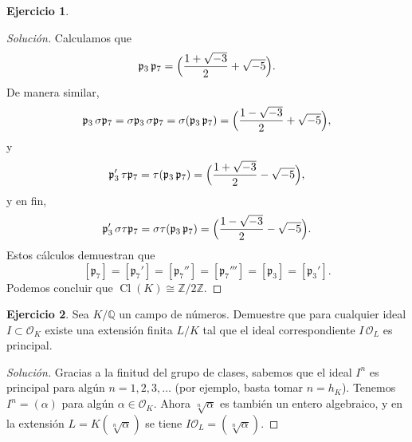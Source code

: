 \documentclass{article}
\newcounter{tarea}
\theoremstyle{definition}
\newtheorem{ejercicio}{Ejercicio}[tarea]
\newenvironment{solucion}{\begin{proof}[Solución]}{\end{proof}}
\DeclareMathOperator{\Cl}{Cl}
\newcommand{\ZZ}{\mathbb{Z}}
\newcommand{\QQ}{\mathbb{Q}}
\renewcommand{\O}{\mathcal{O}}
\begin{document}
\begin{ejercicio}
\begin{solucion}
    Calculamos que
    \[ \mathfrak{p}_3\,\mathfrak{p}_7 =
      \Bigl(\frac{1+\sqrt{-3}}{2} + \sqrt{-5}\Bigr). \]
    De manera similar,
    \[ \mathfrak{p}_3\,\sigma\mathfrak{p}_7 =
      \sigma\mathfrak{p}_3\,\sigma\mathfrak{p}_7 =
      \sigma (\mathfrak{p}_3\,\mathfrak{p}_7) =
      \Bigl(\frac{1-\sqrt{-3}}{2} + \sqrt{-5}\Bigr), \]
    y
    \[ \mathfrak{p}_3'\,\tau\mathfrak{p}_7 =
      \tau (\mathfrak{p}_3\,\mathfrak{p}_7) =
      \Bigl(\frac{1+\sqrt{-3}}{2} - \sqrt{-5}\Bigr), \]
    y en fin,
    \[ \mathfrak{p}_3'\,\sigma\tau\mathfrak{p}_7 =
      \sigma\tau (\mathfrak{p}_3\,\mathfrak{p}_7) =
      \Bigl(\frac{1-\sqrt{-3}}{2} - \sqrt{-5}\Bigr). \]
    Estos cálculos demuestran que
    \[ [\mathfrak{p}_7] =
      [\mathfrak{p}_7'] =
      [\mathfrak{p}_7''] =
      [\mathfrak{p}_7'''] =
      [\mathfrak{p}_3] =
      [\mathfrak{p}_3']. \]
    Podemos concluir que $\Cl (K) \cong \ZZ/2\ZZ$.
  \end{solucion}
  \fi
 \end{ejercicio}

\begin{ejercicio}
  Sea $K/\QQ$ un campo de números. Demuestre que para cualquier ideal
  $I \subset \O_K$ existe una extensión finita $L/K$ tal que el ideal
  correspondiente $I\,\O_L$ es principal.

  \ifdefined\solutions
  \begin{solucion}
    Gracias a la finitud del grupo de clases, sabemos que el ideal $I^n$ es
    principal para algún $n = 1,2,3,\ldots$ (por ejemplo, basta tomar
    $n = h_K$). Tenemos $I^n = (\alpha)$ para algún $\alpha \in \O_K$.
    Ahora $\sqrt[n]{\alpha}$ es también un entero algebraico, y en la extensión
    $L = K (\sqrt[n]{\alpha})$ se tiene $I \mathcal{O}_L = (\sqrt[n]{\alpha})$.
  \end{solucion}
  \fi
\end{ejercicio}
\end{document}
